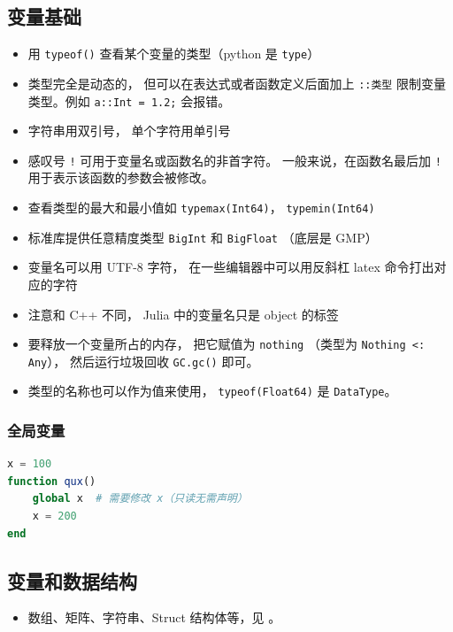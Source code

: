 \subsection{变量基础}
\begin{itemize}
\item 用 \verb`typeof()` 查看某个变量的类型（python 是 \verb`type`）
\item 类型完全是动态的， 但可以在表达式或者函数定义后面加上 \verb`::类型` 限制变量类型。例如 \verb`a::Int = 1.2;` 会报错。
\item 字符串用双引号， 单个字符用单引号
\item 感叹号 \verb`!` 可用于变量名或函数名的非首字符。 一般来说，在函数名最后加 \verb`!` 用于表示该函数的参数会被修改。
\item 查看类型的最大和最小值如 \verb`typemax(Int64)`， \verb`typemin(Int64)`
\item 标准库提供任意精度类型 \verb`BigInt` 和 \verb`BigFloat` （底层是 GMP）
\item 变量名可以用 UTF-8 字符， 在一些编辑器中可以用反斜杠 latex 命令打出对应的字符
\item 注意和 C++ 不同， Julia 中的变量名只是 object 的标签
\item 要释放一个变量所占的内存， 把它赋值为 \verb`nothing` （类型为 \verb`Nothing <: Any`）， 然后运行垃圾回收 \verb`GC.gc()` 即可。
\item 类型的名称也可以作为值来使用， \verb`typeof(Float64)` 是 \verb`DataType`。
\end{itemize}

\subsubsection{全局变量}
\begin{lstlisting}[language=julia]
x = 100
function qux()
    global x  # 需要修改 x（只读无需声明）
    x = 200
end
\end{lstlisting}

\subsection{变量和数据结构}
\begin{itemize}
\item 数组、矩阵、字符串、Struct 结构体等，见 。
\end{itemize}


